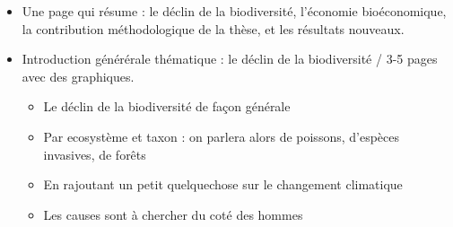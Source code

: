 \begin{itemize}
\item Une page qui résume : le déclin de la biodiversité, l'économie bioéconomique, la contribution méthodologique de la thèse, et les résultats nouveaux. 

\item Introduction générérale thématique : le déclin de la biodiversité / 3-5 pages avec des graphiques. 
\begin{itemize}
\item Le déclin de la biodiversité de façon générale
\item Par ecosystème et taxon : on parlera alors de poissons, d'espèces invasives, de forêts
\item En rajoutant un petit quelquechose sur le changement climatique
\item Les causes sont à chercher du coté des hommes
\end{itemize}


\end{itemize}
